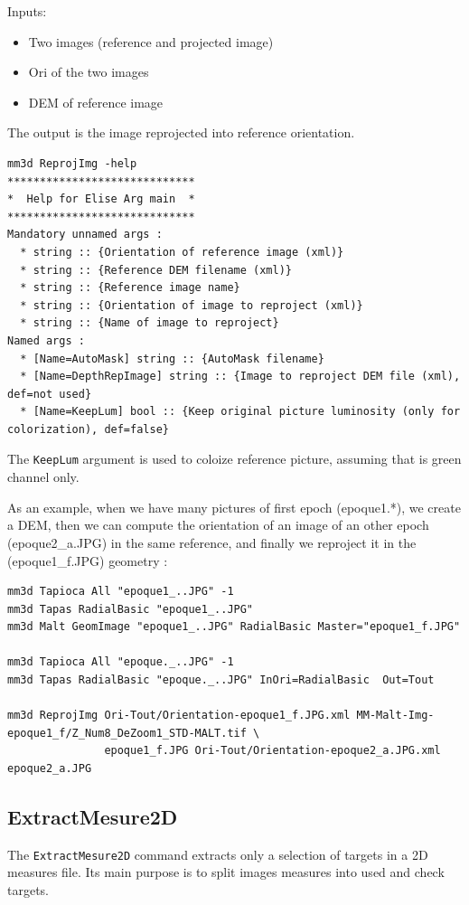 Inputs:
\begin{itemize}
\item Two images (reference and projected image)
\item Ori of the two images
\item DEM of reference image
\end{itemize}

The output is the image reprojected into reference orientation.

\begin{verbatim}
mm3d ReprojImg -help
*****************************
*  Help for Elise Arg main  *
*****************************
Mandatory unnamed args : 
  * string :: {Orientation of reference image (xml)}
  * string :: {Reference DEM filename (xml)}
  * string :: {Reference image name}
  * string :: {Orientation of image to reproject (xml)}
  * string :: {Name of image to reproject}
Named args : 
  * [Name=AutoMask] string :: {AutoMask filename}
  * [Name=DepthRepImage] string :: {Image to reproject DEM file (xml), def=not used}
  * [Name=KeepLum] bool :: {Keep original picture luminosity (only for colorization), def=false}
\end{verbatim}

The {\tt KeepLum} argument is used to coloize reference picture, assuming that is green channel only.

As an example, when we have many pictures of first epoch (epoque1.*), we create a DEM,
then we can compute the orientation of an image of an other epoch (epoque2\_a.JPG) in the same reference,
and finally we reproject it in the (epoque1\_f.JPG) geometry :
\begin{verbatim}
mm3d Tapioca All "epoque1_..JPG" -1
mm3d Tapas RadialBasic "epoque1_..JPG"
mm3d Malt GeomImage "epoque1_..JPG" RadialBasic Master="epoque1_f.JPG"

mm3d Tapioca All "epoque._..JPG" -1
mm3d Tapas RadialBasic "epoque._..JPG" InOri=RadialBasic  Out=Tout

mm3d ReprojImg Ori-Tout/Orientation-epoque1_f.JPG.xml MM-Malt-Img-epoque1_f/Z_Num8_DeZoom1_STD-MALT.tif \
               epoque1_f.JPG Ori-Tout/Orientation-epoque2_a.JPG.xml epoque2_a.JPG
\end{verbatim}

\subsection{ExtractMesure2D}
The {\tt ExtractMesure2D} command extracts only a selection of targets in a 2D measures file. Its main purpose is to split images measures into used and check targets.

